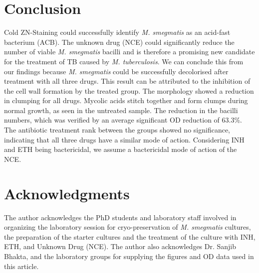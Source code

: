 \documentclass[11pt]{cls/labreport}
\begin{document}
\begin{multicols}{2}
\section{Conclusion}
Cold ZN-Staining  could successfully identify \textit{M. smegmatis} as an acid-fast bacterium (ACB). The unknown drug (NCE) could significantly reduce the number of viable \textit{M. smegmatis} bacilli and is therefore a promising new candidate for the treatment of TB caused by \textit{M. tuberculosis}. 
We can conclude this from our findings because\textit{ M. smegmatis} could be successfully decolorised after treatment with all three drugs. This result can be attributed to the inhibition of the cell wall formation by  the treated group. The morphology showed a reduction in clumping for all drugs. Mycolic acids stitch together and form clumps during normal growth, as seen in the untreated sample. The reduction in the bacilli numbers, which was verified by an average significant OD reduction of 63.3\%. The antibiotic treatment rank between the groups showed no significance, indicating that all three drugs have a similar mode of action. Considering  INH and ETH being bactericidal, we assume a bactericidal mode of action of the NCE.

\section{Acknowledgments}
The author acknowledges the PhD students and laboratory staff involved in organizing the laboratory session for cryo-preservation of\textit{ M. smegmatis} cultures, the preparation of the starter cultures and the treatment of the culture with INH, ETH, and Unknown Drug (NCE). The author also acknowledges Dr. Sanjib Bhakta, and the laboratory groups for supplying the figures and OD data used in this article. 


\end{multicols}
\end{document}
